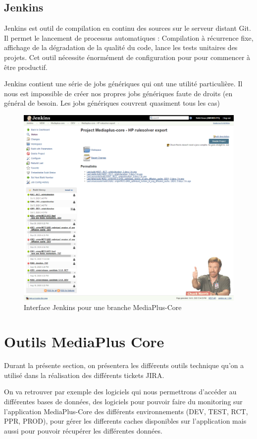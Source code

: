 \subsection{Jenkins}
\par Jenkins est outil de compilation en continu des sources sur le serveur distant  Git. Il permet le lancement de processus automatiques : Compilation à  récurrence fixe, affichage de la dégradation de la qualité du code, lance les  tests unitaires des projets. Cet outil nécessite énormément de configuration  pour pour commencer à être productif. 
\par Jenkins contient une série de jobs génériques qui ont une utilité particulière. Il  nous est impossible de créer nos propres jobs génériques faute de droits (en  général de besoin. Les jobs génériques couvrent quasiment tous les cas)
\begin{figure}[ht]
    \centering
    \includegraphics[width=\columnwidth]{img/jenkins.png}
    \caption{Interface Jenkins pour une branche MediaPlus-Core}
\end{figure}
\clearpage
\section{Outils MediaPlus Core}
\par Durant la présente section, on présentera les différents outils technique qu'on a utilisé dans la réalisation des différents tickets JIRA.
\par On va retrouver par exemple des logiciels qui nous permettrons d'accéder au différentes bases de données, des logiciels pour pouvoir faire du monitoring sur l'application MediaPlus-Core des différents environnements (DEV, TEST, RCT, PPR, PROD), pour gérer les differents caches disponibles sur l'application mais aussi pour pouvoir récupérer les différentes données.

